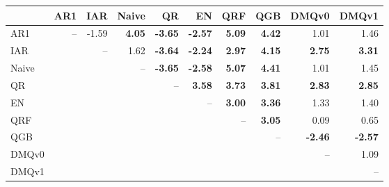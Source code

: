 \begin{tabular}{lrrrrrrrrr}
\toprule
 & AR1 & IAR & Naive & QR & EN & QRF & QGB & DMQv0 & DMQv1 \\
\midrule
AR1 & -- & -1.59 & \textbf{4.05} & \textbf{-3.65} & \textbf{-2.57} & \textbf{5.09} & \textbf{4.42} & 1.01 & 1.46 \\
IAR &  & -- & 1.62 & \textbf{-3.64} & \textbf{-2.24} & \textbf{2.97} & \textbf{4.15} & \textbf{2.75} & \textbf{3.31} \\
Naive &  &  & -- & \textbf{-3.65} & \textbf{-2.58} & \textbf{5.07} & \textbf{4.41} & 1.01 & 1.45 \\
QR &  &  &  & -- & \textbf{3.58} & \textbf{3.73} & \textbf{3.81} & \textbf{2.83} & \textbf{2.85} \\
EN &  &  &  &  & -- & \textbf{3.00} & \textbf{3.36} & 1.33 & 1.40 \\
QRF &  &  &  &  &  & -- & \textbf{3.05} & 0.09 & 0.65 \\
QGB &  &  &  &  &  &  & -- & \textbf{-2.46} & \textbf{-2.57} \\
DMQv0 &  &  &  &  &  &  &  & -- & 1.09 \\
DMQv1 &  &  &  &  &  &  &  &  & -- \\
\bottomrule
\end{tabular}
